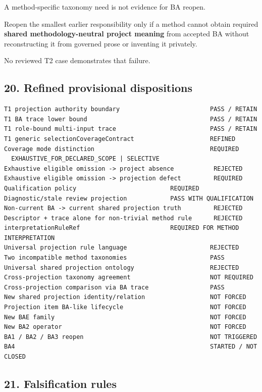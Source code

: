 \documentclass[11pt,a4paper]{article}
\begin{document}
A method-specific taxonomy need is not evidence for BA reopen.

Reopen the smallest earlier responsibility only if a method cannot
obtain required \textbf{shared methodology-neutral project meaning} from
accepted BA without reconstructing it from governed prose or inventing
it privately.

No reviewed T2 case demonstrates that failure.

\subsection{20. Refined provisional
dispositions}\label{20-refined-provisional-dispositions}

\begin{verbatim}
T1 projection authority boundary                         PASS / RETAIN
T1 BA trace lower bound                                  PASS / RETAIN
T1 role-bound multi-input trace                          PASS / RETAIN
T1 generic selectionCoverageContract                     REFINED
Coverage mode distinction                                REQUIRED
  EXHAUSTIVE_FOR_DECLARED_SCOPE | SELECTIVE
Exhaustive eligible omission -> project absence           REJECTED
Exhaustive eligible omission -> projection defect         REQUIRED
Qualification policy                          REQUIRED
Diagnostic/stale review projection            PASS WITH QUALIFICATION
Non-current BA -> current shared projection truth         REJECTED
Descriptor + trace alone for non-trivial method rule      REJECTED
interpretationRuleRef                         REQUIRED FOR METHOD INTERPRETATION
Universal projection rule language                       REJECTED
Two incompatible method taxonomies                       PASS
Universal shared projection ontology                     REJECTED
Cross-projection taxonomy agreement                      NOT REQUIRED
Cross-projection comparison via BA trace                 PASS
New shared projection identity/relation                  NOT FORCED
Projection item BA-like lifecycle                        NOT FORCED
New BAE family                                           NOT FORCED
New BA2 operator                                         NOT FORCED
BA1 / BA2 / BA3 reopen                                   NOT TRIGGERED
BA4                                                      STARTED / NOT CLOSED
\end{verbatim}

\subsection{21. Falsification rules}\label{21-falsification-rules}
\end{document}
